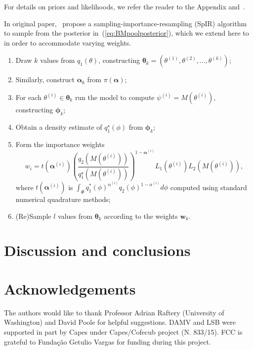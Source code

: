 \documentclass[a4paper, notitlepage, 10pt]{article}
\begin{document}
For details on priors and likelihoods, we refer the reader to the Appendix and~\cite{poole2000}.

In original paper,~\cite[sec. 3.4]{poole2000} propose a sampling-importance-resampling (SpIR) algorithm to sample from the posterior in~(\ref{eq:BMpoolposterior}), which we extend here to in order to accommodate varying weights.
\begin{enumerate}
 \item Draw $k$ values from  $q_1(\theta)$, constructing $\boldsymbol \theta_k = (\theta^{(1)}, \theta^{(2)}, \ldots, \theta^{(k)} )$;
 \item Similarly, construct $\boldsymbol \alpha_k$ from $\pi(\boldsymbol \alpha)$;
 \item For each $\theta^{(i)} \in \boldsymbol\theta_k$ run the model to compute $\psi^{(i)} = M(\theta^{(i)})$, constructing $\boldsymbol \phi_k$;
 \item Obtain a density estimate of $q_1^\star(\phi)$ from  $\boldsymbol \phi_k$;
 \item Form the importance weights 
 \begin{equation}
 \label{eq:SpIRweights}
  w_i = t(\boldsymbol \alpha^{(i)}) \left(\frac{q_2(M(\theta^{(i)}))}{q_1^\star(M(\theta^{(i)}))}\right)^{1 - \boldsymbol \alpha^{(i)}} L_1(\theta^{(i)}) L_2(M(\theta^{(i)})),
 \end{equation}
where $t(\boldsymbol \alpha^{(i)})$ is $\int_{\Phi} q_1^\ast(\phi)^{\alpha^{(i)}} q_2(\phi)^{1-\alpha^{(i)}} d\phi$ computed using standard numerical quadrature methods;
 \item (Re)Sample $l$ values from $\boldsymbol \theta_k$ according to the weights $\boldsymbol w_k$.
\end{enumerate}

\section{Discussion and conclusions}
\label{sec:discussion}


\section{Acknowledgements}
The authors would like to thank Professor Adrian Raftery (University of Washington) and David Poole for helpful suggestions.
DAMV and LSB were supported in part by Capes under Capes/Cofecub project (N. 833/15).
FCC is grateful to Funda\c{c}\~ao Getulio Vargas for funding during this 
project.

\end{document}
